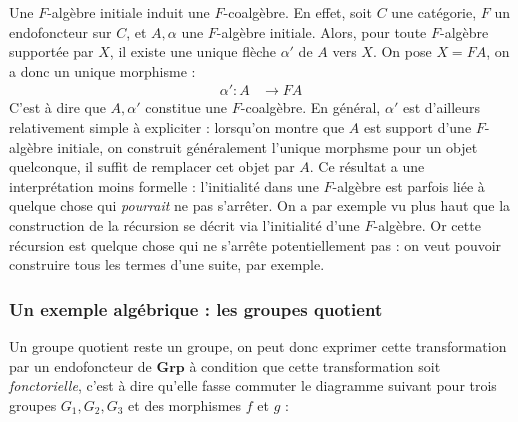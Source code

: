 \documentclass{article}
\begin{document}
Une $F$-algèbre initiale induit une $F$-coalgèbre. En effet, soit $C$ une catégorie, $F$ un endofoncteur sur $C$, et $A, \alpha$ une $F$-algèbre initiale. Alors, pour toute $F$-algèbre supportée par $X$, il existe une unique flèche $ \alpha'$ de $A$ vers $X$. On pose $X = FA$, on a donc un unique morphisme : 
\begin{align*}
    \alpha' : A & \rightarrow FA 
\end{align*}
C'est à dire que $A, \alpha'$ constitue une $F$-coalgèbre. En général, $\alpha'$ est d'ailleurs relativement simple à expliciter : lorsqu'on montre que $A$ est support d'une $F$-algèbre initiale, on construit généralement l'unique morphsme pour un objet quelconque, il suffit de remplacer cet objet par $A$.
Ce résultat a une interprétation moins formelle : l'initialité dans une $F$-algèbre est parfois liée à quelque chose qui \textit{pourrait} ne pas s'arrêter. On a par exemple vu plus haut que la construction de la récursion se décrit via l'initialité d'une $F$-algèbre. Or cette récursion est quelque chose qui ne s'arrête potentiellement pas : on veut pouvoir construire tous les termes d'une suite, par exemple. 

\subsubsection{Un exemple algébrique : les groupes quotient}

Un groupe quotient reste un groupe, on peut donc exprimer cette transformation par un endofoncteur de $\mathbf{Grp}$ à condition que cette transformation soit \textit{fonctorielle}, c'est à dire qu'elle fasse commuter le diagramme suivant pour trois groupes $G_1,G_2,G_3$ et des morphismes $f$ et $g$ : 

\begin{center}
\end{center}
\end{document}
